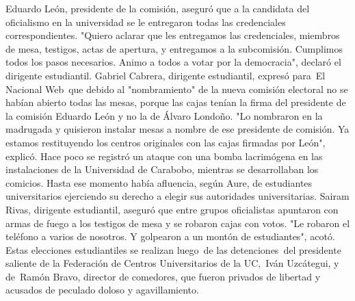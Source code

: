 \documentclass{article}%
\begin{document}
\newline%
%
Eduardo León, presidente de la comisión, aseguró que a la candidata del oficialismo en la universidad se le entregaron todas las credenciales correspondientes.%
\newline%
%
"Quiero aclarar que les entregamos las credenciales, miembros de mesa, testigos, actas de apertura, y entregamos a la subcomisión. Cumplimos todos los pasos necesarios. Animo a todos a votar por la democracia", declaró el dirigente estudiantil.%
\newline%
%
Gabriel Cabrera, dirigente estudiantil, expresó para~El Nacional Web~que debido al "nombramiento" de la nueva comisión electoral no se habían abierto todas las mesas, porque las cajas tenían la firma del presidente de la comisión Eduardo León y no la de Álvaro Londoño.%
\newline%
%
"Lo nombraron en la madrugada y quisieron instalar mesas a nombre de ese presidente de comisión. Ya estamos restituyendo los centros originales con las cajas firmadas por León", explicó.%
\newline%
%
Hace poco se registró un ataque con una bomba lacrimógena en las instalaciones de la Universidad de Carabobo, mientras se desarrollaban los comicios. Hasta ese momento había afluencia, según Aure, de estudiantes universitarios ejerciendo su derecho a elegir sus autoridades universitarias.%
\newline%
%
Sairam Rivas, dirigente estudiantil, aseguró que entre grupos oficialistas apuntaron con armas de fuego a los testigos de mesa y se robaron cajas con votos.%
\newline%
%
"Le robaron el teléfono a varios de nosotros. Y golpearon a un montón de estudiantes", acotó.%
\newline%
%
Estas elecciones estudiantiles se realizan luego~de las detenciones~del presidente saliente de la Federación de Centros Universitarios de la UC,~Iván Uzcátegui, y de~Ramón Bravo, director de comedores, que fueron privados de libertad y acusados de peculado doloso y agavillamiento.%
\newline%
%
\end{document}
